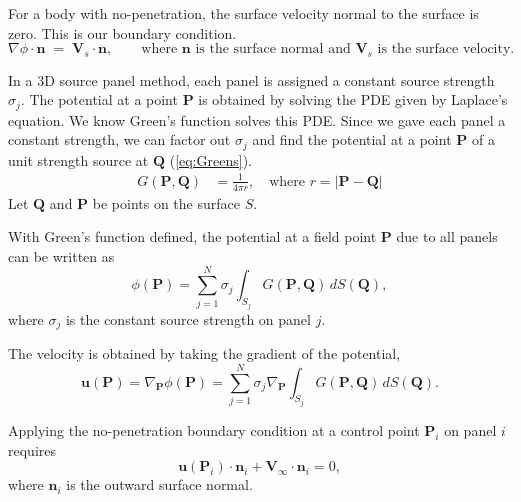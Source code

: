 \documentclass[conf]{new-aiaa} %
\begin{document}
For a body with no-penetration, the surface velocity normal to the surface is zero. This is our boundary condition.
\begin{equation}
\nabla \phi \cdot \mathbf{n} 
\;=\; \mathbf{V}_s \cdot \mathbf{n},
\qquad \text{where $\mathbf{n}$ is the surface normal and $\mathbf{V}_s$ is the surface velocity.}
\label{eq:bc}
\end{equation}

In a 3D source panel method, each panel is assigned a constant source strength $\sigma_j$.
The potential at a point $\mathbf{P}$ is obtained by solving the PDE given by Laplace's equation. 
We know Green's function solves this PDE.
Since we gave each panel a constant strength, we can factor out $\sigma_j$ and find the potential at a point $\mathbf{P}$ of a unit strength source at $\mathbf{Q}$ (\autoref{eq:Greens}).
\begin{align}
G(\mathbf{P},\mathbf{Q}) &= \frac{1}{4\pi r}, 
\quad \text{where } r = \lvert \mathbf{P} - \mathbf{Q} \rvert 
\label{eq:Greens}
\end{align}
\noindent Let $\mathbf{Q}$ and $\mathbf{P}$ be points on the surface $S$.
\vspace{1em}

With Green's function defined, the potential at a field point $\mathbf{P}$ due to all panels can be written as
\begin{equation}
\phi(\mathbf{P}) = \sum_{j=1}^N \sigma_j \int_{S_j} G(\mathbf{P}, \mathbf{Q}) \, dS(\mathbf{Q}),
\label{eq:potential_sum}
\end{equation}
where $\sigma_j$ is the constant source strength on panel $j$.
\vspace{1em}

The velocity is obtained by taking the gradient of the potential,
\begin{equation}
\mathbf{u}(\mathbf{P}) = \nabla_{\mathbf{P}} \phi(\mathbf{P})
= \sum_{j=1}^N \sigma_j \nabla_{\mathbf{P}}
\int_{S_j} G(\mathbf{P}, \mathbf{Q}) \, dS(\mathbf{Q}).
\end{equation}

Applying the no-penetration boundary condition at a control point $\mathbf{P}_i$ on panel $i$ requires
\begin{equation}
\mathbf{u}(\mathbf{P}_i) \cdot \mathbf{n}_i + \mathbf{V}_\infty \cdot \mathbf{n}_i = 0,
\label{eq:boundary}
\end{equation}
where $\mathbf{n}_i$ is the outward surface normal.
\vspace{1em}
\end{document}
